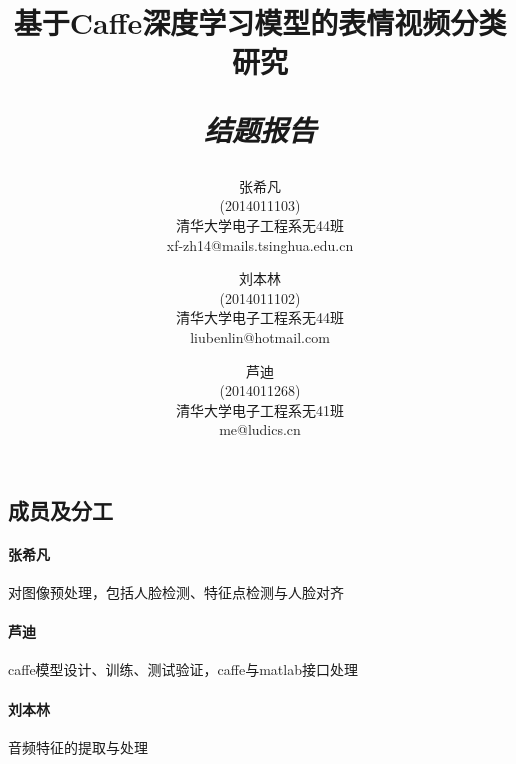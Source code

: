 \documentclass{article}
\title{\textbf{基于Caffe深度学习模型的表情视频分类研究} \\ [1.5ex] \begin{large} \emph{结题报告} \end{large} }
\author{
            张希凡 \\ (2014011103) \\ 清华大学电子工程系无44班 \\ xf-zh14@mails.tsinghua.edu.cn
            \and
            刘本林 \\ (2014011102) \\ 清华大学电子工程系无44班 \\ liubenlin@hotmail.com
            \and
            芦迪 \\ (2014011268) \\ 清华大学电子工程系无41班 \\ me@ludics.cn}
\date{}
\begin{document}
    \maketitle

\begin{multicols}{2}
    \section{成员及分工}
        \paragraph{张希凡}
        对图像预处理，包括人脸检测、特征点检测与人脸对齐
        \paragraph{芦迪}
        caffe模型设计、训练、测试验证，caffe与matlab接口处理
        \paragraph{刘本林}
        音频特征的提取与处理


\end{multicols}
\end{document}
